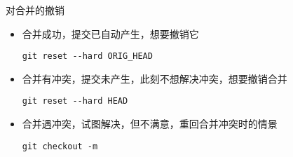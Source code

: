 \begin{frame}[<+->][fragile]{对合并的撤销}
    \begin{itemize}
        \item 合并成功，提交已自动产生，想要撤销它
        \begin{Verbatim}[frame=single,commandchars=\\\{\}]
git reset --hard ORIG_HEAD
        \end{Verbatim}
        \item 合并有冲突，提交未产生，此刻不想解决冲突，想要撤销合并
        \begin{Verbatim}[frame=single,commandchars=\\\{\}]
git reset --hard HEAD
        \end{Verbatim}
        \item 合并遇冲突，试图解决，但不满意，重回合并冲突时的情景
        \begin{Verbatim}[frame=single,commandchars=\\\{\}]
git checkout -m
        \end{Verbatim}
    \end{itemize}
\end{frame}
